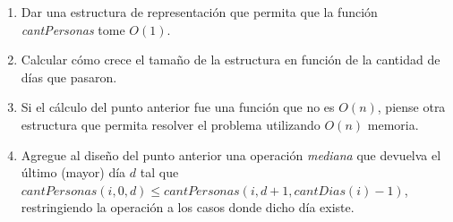 \begin{enumerate}
	\item Dar una estructura de representación que permita que la función \textit{cantPersonas} tome $O(1)$.
	\item Calcular cómo crece el tamaño de la estructura en función de la cantidad de días que pasaron.
	\item Si el cálculo del punto anterior fue una función que no es $O(n)$, piense otra estructura que permita resolver el problema utilizando $O(n)$ memoria.
	\item Agregue al diseño del punto anterior una operación \textit{mediana} que devuelva el último (mayor) día $d$ tal que $cantPersonas(i, 0, d) \leq cantPersonas(i, d + 1, cantDias(i) - 1)$, restringiendo la operación a los casos donde dicho día existe.
\end{enumerate}

